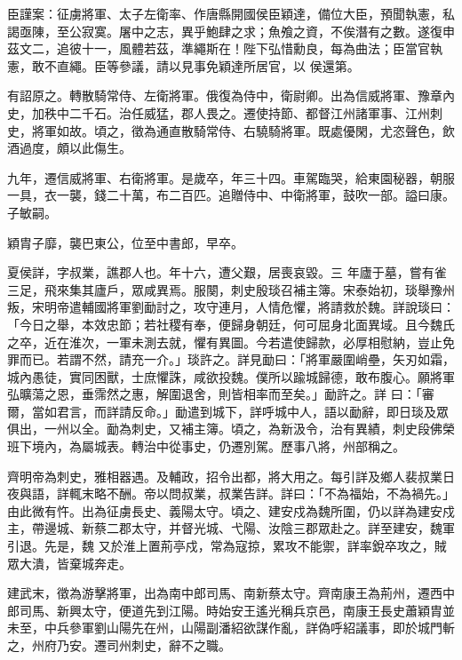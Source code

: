 \begin{pinyinscope}
 臣謹案：征虜將軍、太子左衛率、作唐縣開國侯臣穎達，備位大臣，預聞執憲，私謁亟陳，至公寂寞。屠中之志，異乎鮑肆之求；魚飧之資，不俟潛有之數。遂復申茲文二，追彼十一，風體若茲，準繩斯在！陛下弘惜勳良，每為曲法；臣當官執憲，敢不直繩。臣等參議，請以見事免穎達所居官，以
 侯還第。



 有詔原之。轉散騎常侍、左衛將軍。俄復為侍中，衛尉卿。出為信威將軍、豫章內史，加秩中二千石。治任威猛，郡人畏之。遷使持節、都督江州諸軍事、江州刺史，將軍如故。頃之，徵為通直散騎常侍、右驍騎將軍。既處優閑，尤恣聲色，飲酒過度，頗以此傷生。



 九年，遷信威將軍、右衛將軍。是歲卒，年三十四。車駕臨哭，給東園秘器，朝服一具，衣一襲，錢二十萬，布二百匹。追贈侍中、中衛將軍，鼓吹一部。謚曰康。子敏嗣。



 穎胄子靡，襲巴東公，位至中書郎，早卒。



 夏侯詳，字叔業，譙郡人也。年十六，遭父艱，居喪哀毀。三
 年廬于墓，嘗有雀三足，飛來集其廬戶，眾咸異焉。服闋，刺史殷琰召補主簿。宋泰始初，琰舉豫州叛，宋明帝遣輔國將軍劉勔討之，攻守連月，人情危懼，將請救於魏。詳說琰曰：「今日之舉，本效忠節；若社稷有奉，便歸身朝廷，何可屈身北面異域。且今魏氏之卒，近在淮次，一軍未測去就，懼有異圖。今若遣使歸款，必厚相慰納，豈止免罪而已。若謂不然，請充一介。」琰許之。詳見勔曰：「將軍嚴圍峭壘，矢刃如霜，城內愚徒，實同困獸，士庶懼誅，咸欲投魏。僕所以踰城歸德，敢布腹心。願將軍弘曠蕩之恩，垂霈然之惠，解圍退舍，則皆相率而至矣。」勔許之。詳
 曰：「審爾，當如君言，而詳請反命。」勔遣到城下，詳呼城中人，語以勔辭，即日琰及眾俱出，一州以全。勔為刺史，又補主簿。頃之，為新汲令，治有異績，刺史段佛榮班下境內，為屬城表。轉治中從事史，仍遷別駕。歷事八將，州部稱之。



 齊明帝為刺史，雅相器遇。及輔政，招令出都，將大用之。每引詳及鄉人裴叔業日夜與語，詳輒末略不酬。帝以問叔業，叔業告詳。詳曰：「不為福始，不為禍先。」由此微有忤。出為征虜長史、義陽太守。頃之、建安戍為魏所圍，仍以詳為建安戍主，帶邊城、新蔡二郡太守，并督光城、弋陽、汝陰三郡眾赴之。詳至建安，魏軍引退。先是，魏
 又於淮上置荊亭戍，常為寇掠，累攻不能禦，詳率銳卒攻之，賊眾大潰，皆棄城奔走。



 建武末，徵為游擊將軍，出為南中郎司馬、南新蔡太守。齊南康王為荊州，遷西中郎司馬、新興太守，便道先到江陽。時始安王遙光稱兵京邑，南康王長史蕭穎胄並未至，中兵參軍劉山陽先在州，山陽副潘紹欲謀作亂，詳偽呼紹議事，即於城門斬之，州府乃安。遷司州刺史，辭不之職。




\end{pinyinscope}
